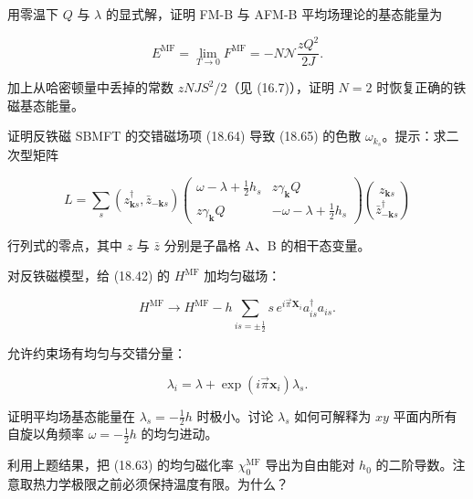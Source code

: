 \begin{exercises}

\item 用零温下 $Q$ 与 $\lambda$ 的显式解，证明 FM-B 与 AFM-B 平均场理论的基态能量为

\begin{equation*}
E ^ {\mathrm{MF}} = \lim_{T \to 0} F ^ {\mathrm{MF}} = - N \mathcal {N} \frac {z Q ^ {2}}{2 J}.
\tag{18.90}
\end{equation*}

加上从哈密顿量中丢掉的常数 $zNJS^{2}/2$（见 (16.7)），证明 $N = 2$ 时恢复正确的铁磁基态能量。

\item 证明反铁磁 SBMFT 的交错磁场项 (18.64) 导致 (18.65) 的色散 $\omega_{k_{s}}$。提示：求二次型矩阵

\begin{equation*}
L = \sum_ {s} \left( z_{\mathbf {k} s} ^ {\dagger}, \bar {z}_{- \mathbf {k} s} \right) \left( \begin{array}{cc} \omega - \lambda + \frac {1}{2} h _ {s} & z \gamma_{\mathbf {k}} Q \\ z \gamma_{\mathbf {k}} Q & - \omega - \lambda + \frac {1}{2} h _ {s} \end{array} \right) \binom{z_{\mathbf {k} s}}{\bar {z}_{- \mathbf {k} s} ^ {\dagger}}
\tag{18.91}
\end{equation*}

行列式的零点，其中 $z$ 与 $\bar{z}$ 分别是子晶格 A、B 的相干态变量。

\item 对反铁磁模型，给 (18.42) 的 $H^{\mathrm{MF}}$ 加均匀磁场：

\begin{equation*}
H ^ {\mathrm{MF}} \rightarrow H ^ {\mathrm{MF}} - h \sum_{is = \pm \frac {1}{2}} s \, e ^ {i \vec {\pi} \mathbf {X} _ {i}} a _ {is} ^ {\dagger} a _ {is}.
\tag{18.92}
\end{equation*}

允许约束场有均匀与交错分量：

\begin{equation*}
\lambda_ {i} = \lambda + \exp \left( i \vec {\pi} \mathbf {x} _ {i} \right) \lambda_ {s}.
\tag{18.93}
\end{equation*}

证明平均场基态能量在 $\lambda_{s} = -\frac{1}{2}h$ 时极小。讨论 $\lambda_{s}$ 如何可解释为 $xy$ 平面内所有自旋以角频率 $\omega = -\frac{1}{2}h$ 的均匀进动。

\item 利用上题结果，把 (18.63) 的均匀磁化率 $\chi_{0}^{\mathrm{MF}}$ 导出为自由能对 $h_{0}$ 的二阶导数。注意取热力学极限之前必须保持温度有限。为什么？

\end{exercises}

